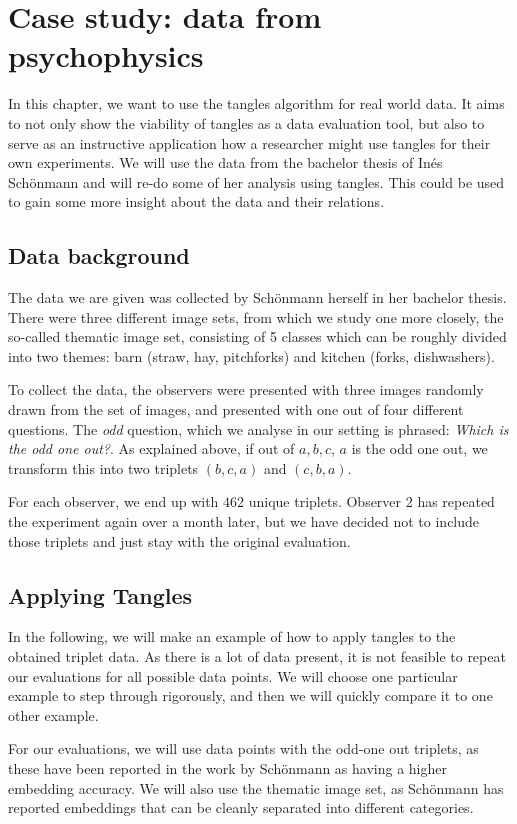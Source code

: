 \chapter{Case study: data from psychophysics}\label{simulations}
In this chapter, we want to use the tangles algorithm for real world data. 
It aims to not only show the viability of tangles as a data evaluation tool, but also to serve as an 
instructive application how a researcher might use tangles for their own experiments. We will use the data
from the bachelor thesis of Inés Schönmann 
and will re-do some of her analysis using tangles. This could be used to gain some more insight about the
data and their relations.

\section{Data background}
The data we are given was collected by Schönmann herself in her bachelor thesis. There were three different image sets, from which we study one more closely, the
so-called thematic image set, consisting of 5 classes which can be roughly divided into two themes: barn (straw, hay, pitchforks) and kitchen (forks, dishwashers).

To collect the data, the observers were presented with three images randomly drawn from the set of images, and presented with one out of four different questions. 
The \textit{odd} question, which we analyse in our setting is phrased: \textit{Which is the odd one out?}.  
As explained above, if out of $a,b,c$, $a$ is the odd one out, we transform this into two triplets $(b, c, a)$ and $(c, b, a)$.

For each observer, we end up with $462$ unique triplets. Observer 2 has repeated the experiment again over a month later, but we have decided not to include 
those triplets and just stay with the original evaluation.

\section{Applying Tangles}
In the following, we will make an example of how to apply tangles to the obtained triplet data.
As there is a lot of data present, it is not feasible to repeat our evaluations for all possible data points.
We will choose one particular example to step through rigorously, and then we will quickly compare it to one other example.

For our evaluations, we will use data points with the odd-one out triplets, as these have been reported in the work by Schönmann as 
having a higher embedding accuracy. We will also use the thematic image set, as Schönmann has reported embeddings that can be cleanly 
separated into different categories.

